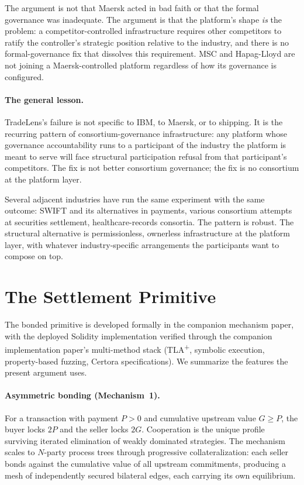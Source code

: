 \documentclass[11pt,a4paper]{article}
\theoremstyle{definition}
\theoremstyle{remark}
\newcommand{\pay}{P}
\newcommand{\cumval}{G}
\begin{document}
The argument is not that Maersk acted in bad faith or that the
formal governance was inadequate. The argument is that the
platform's shape \emph{is} the problem: a competitor-controlled
infrastructure requires other competitors to ratify the
controller's strategic position relative to the industry, and
there is no formal-governance fix that dissolves this
requirement. MSC and Hapag-Lloyd are not joining a Maersk-controlled
platform regardless of how its governance is configured.

\paragraph{The general lesson.}
TradeLens's failure is not specific to IBM, to Maersk, or to
shipping. It is the recurring pattern of consortium-governance
infrastructure: any platform whose governance accountability runs
to a participant of the industry the platform is meant to serve
will face structural participation refusal from that
participant's competitors. The fix is not better consortium
governance; the fix is no consortium at the platform layer.

Several adjacent industries have run the same experiment with
the same outcome: SWIFT and its alternatives in payments,
various consortium attempts at securities settlement,
healthcare-records consortia. The pattern is robust. The
structural alternative is permissionless, ownerless infrastructure
at the platform layer, with whatever industry-specific arrangements
the participants want to compose on top.

\section{The Settlement Primitive}
\label{sec:primitive}

The bonded primitive is developed formally in the companion
mechanism paper, with the deployed Solidity implementation
verified through the companion implementation paper's
multi-method stack (TLA\textsuperscript{+}, symbolic execution,
property-based fuzzing, Certora specifications). We summarize
the features the present argument uses.

\paragraph{Asymmetric bonding (Mechanism~1).}
For a transaction with payment $\pay > 0$ and cumulative upstream
value $\cumval \geq \pay$, the buyer locks $2\pay$ and the seller
locks $2\cumval$. Cooperation is the unique profile surviving
iterated elimination of weakly dominated strategies. The
mechanism scales to $N$-party process trees through progressive
collateralization: each seller bonds against the cumulative value
of all upstream commitments, producing a mesh of independently
secured bilateral edges, each carrying its own equilibrium.
\end{document}
